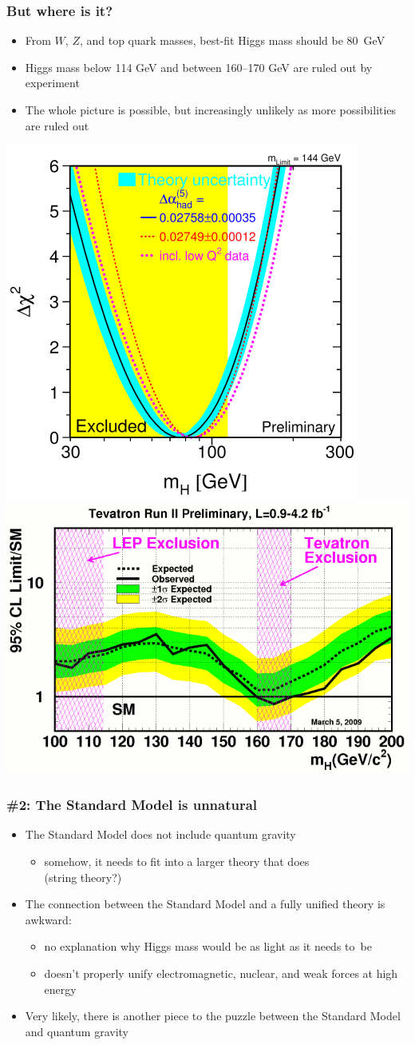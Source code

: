 \documentclass[compress]{beamer}
\begin{document}
\begin{frame}
\frametitle{But where is it?}

\begin{itemize}
\item From $W$, $Z$, and top quark masses, best-fit Higgs mass should be 80~GeV
\item Higgs mass below 114 GeV and between 160--170 GeV are ruled out by experiment
\item The whole picture is possible, but increasingly unlikely as more
  possibilities are ruled out
\end{itemize}

\includegraphics[height=4.3 cm]{higgsMass.png} \hfill
\includegraphics[height=4.3 cm]{fermilab_higgs_exclusion.png}
\end{frame}

\begin{frame}
\frametitle{\#2: The Standard Model is unnatural}

\begin{itemize}
\item The Standard Model does not include quantum gravity
\begin{itemize}
\item somehow, it needs to fit into a larger theory that does \\ (string theory?)
\end{itemize}
\item The connection between the Standard Model and a fully unified theory is awkward:
\begin{itemize}
\item no explanation why Higgs mass would be as light as it needs \mbox{to be\hspace{-1 cm}}
\item doesn't properly unify electromagnetic, nuclear, and weak forces at high energy
\end{itemize}
\item Very likely, there is another piece to the puzzle between the
  Standard Model and quantum gravity
\end{itemize}
\end{frame}
\end{document}
